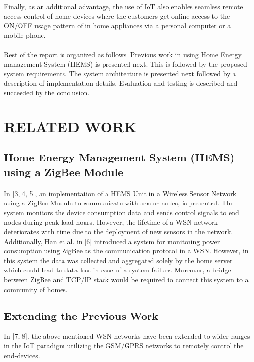 \documentclass[a4paper,12pt,oneside]{article}
\begin{document}
\paragraph{}
Finally, as
an additional advantage, the use of IoT also enables seamless
remote access control of home devices where the customers
get online access to the ON/OFF usage pattern of in home
appliances via a personal computer or a mobile phone.
\paragraph{}
Rest of the report is organized as follows. Previous work in
using Home Energy management System (HEMS) is
presented next. This is followed by the proposed system
requirements. The system architecture is presented next
followed by a description of implementation details.
Evaluation and testing is described and succeeded by the
conclusion.

\newpage
\section{RELATED WORK}
\subsection{Home Energy Management System (HEMS) using a ZigBee Module}
\paragraph{}
In [3, 4, 5], an
implementation of a HEMS Unit in a Wireless Sensor
Network using a ZigBee Module to communicate with sensor
nodes, is presented. The system monitors the device
consumption data and sends control signals to end nodes
during peak load hours. However, the lifetime of a WSN
network deteriorates with time due to the deployment of new
sensors in the network. Additionally, Han et al. in [6]
introduced a system for monitoring power consumption using
ZigBee as the communication protocol in a WSN. However,
in this system the data was collected and aggregated solely by
the home server which could lead to data loss in case of a
system failure. Moreover, a bridge between ZigBee and
TCP/IP stack would be required to connect this system to a
community of homes.

\subsection{Extending the Previous Work}
In [7, 8], the above mentioned WSN networks have been extended
to wider ranges in the IoT paradigm utilizing the GSM/GPRS
networks to remotely control the end-devices.
\end{document}

